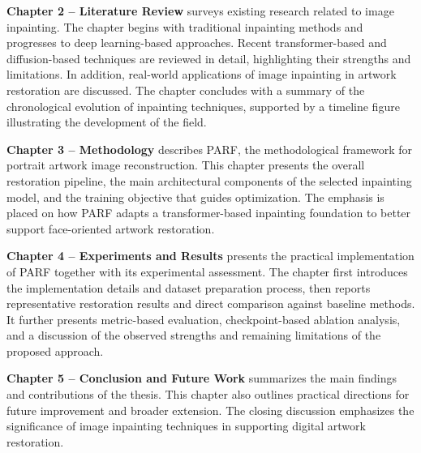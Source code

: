 \documentclass[12pt, twoside]{report}
\begin{document}
\par \hspace{0.5cm} \textbf{Chapter 2 -- Literature Review} surveys existing research related to image inpainting. The chapter begins with traditional inpainting methods and progresses to deep learning-based approaches. Recent transformer-based and diffusion-based techniques are reviewed in detail, highlighting their strengths and limitations. In addition, real-world applications of image inpainting in artwork restoration are discussed. The chapter concludes with a summary of the chronological evolution of inpainting techniques, supported by a timeline figure illustrating the development of the field.

\par \hspace{0.5cm} \textbf{Chapter 3 -- Methodology} describes PARF, the methodological framework for portrait artwork image reconstruction. This chapter presents the overall restoration pipeline, the main architectural components of the selected inpainting model, and the training objective that guides optimization. The emphasis is placed on how PARF adapts a transformer-based inpainting foundation to better support face-oriented artwork restoration.

\par \hspace{0.5cm} \textbf{Chapter 4 -- Experiments and Results} presents the practical implementation of PARF together with its experimental assessment. The chapter first introduces the implementation details and dataset preparation process, then reports representative restoration results and direct comparison against baseline methods. It further presents metric-based evaluation, checkpoint-based ablation analysis, and a discussion of the observed strengths and remaining limitations of the proposed approach.

\par \hspace{0.5cm} \textbf{Chapter 5 -- Conclusion and Future Work} summarizes the main findings and contributions of the thesis. This chapter also outlines practical directions for future improvement and broader extension. The closing discussion emphasizes the significance of image inpainting techniques in supporting digital artwork restoration.


\end{document}
